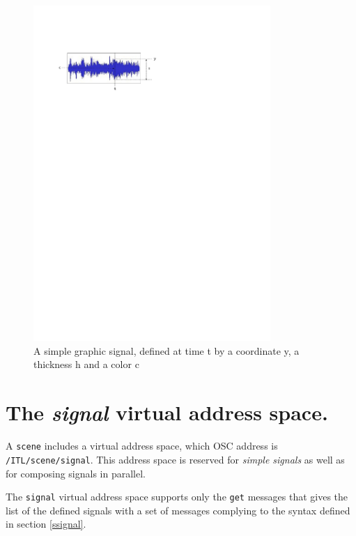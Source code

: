 \documentclass[a4paper,twoside]{report}
\newcommand{\sublevel}[1]	{\section{#1}}
\newcommand{\fullref}[1]	{\ref{#1} p.\pageref{#1}}
\newcommand{\OSC}[1]		{\texttt{#1}}
\begin{document}
\begin{figure}[h]
	\centering \includegraphics[width=90mm]{imgs/graph}
 \caption{A simple graphic signal, defined at time t by a coordinate y, a thickness h and a color c}
 \label{graphimg}
\end{figure}

\sublevel{The \textit{signal} virtual address space.}
A \OSC{scene} includes a virtual address space, which OSC address is \OSC{/ITL/scene/signal}. This address space is reserved for \emph{simple signals} as well as for composing signals in parallel.

The \OSC{signal} virtual address space supports only the \OSC{get} messages that gives the list of the defined signals with a set of messages complying to the syntax defined in section \ref{ssignal}.

%
\end{document}
